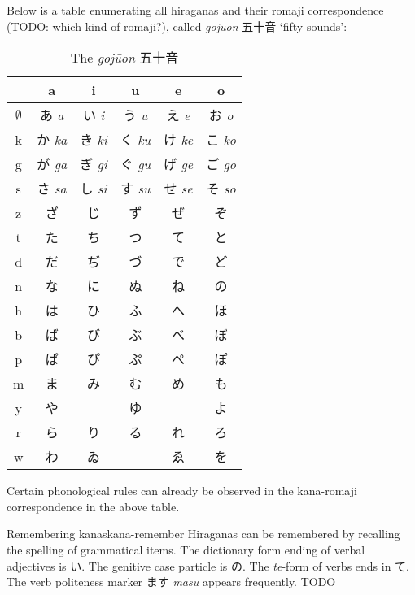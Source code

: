 \documentclass[UTF8, a4paper, oneside, scheme=plain]{ctexrep}
\newcommand{\corpus}[1]{\emph{#1}}
\newcommand{\translate}[1]{`#1'}
\begin{document}
Below is a table enumerating all hiraganas and their romaji correspondence (TODO: which kind of romaji?), 
called \corpus{gojūon} 五十音 \translate{fifty sounds}:
\begin{table}[H]
    \caption{The \corpus{gojūon} 五十音}
    \label{tbl:hiragana-chart}
    \centering
    \begin{tabular}{cccccc}
        \toprule
         & a & i & u & e & o \\ 
        \midrule
        $\emptyset$ & あ \corpus{a} & い \corpus{i} & う \corpus{u} & え \corpus{e} & お \corpus{o} \\ 
        k & か \corpus{ka} & き \corpus{ki} & く \corpus{ku} & け \corpus{ke} & こ \corpus{ko} \\ 
        g & が \corpus{ga} & ぎ \corpus{gi} & ぐ \corpus{gu} & げ \corpus{ge} & ご \corpus{go} \\ 
        s & さ \corpus{sa} & し \corpus{si} & す \corpus{su} & せ \corpus{se} & そ \corpus{so} \\ 
        z & ざ & じ & ず & ぜ & ぞ \\ 
        t & た & ち & つ & て & と \\ 
        d & だ & ぢ & づ & で & ど \\ 
        n & な & に & ぬ & ね & の \\ 
        h & は & ひ & ふ & へ & ほ \\ 
        b & ば & び & ぶ & べ & ぼ \\ 
        p & ぱ & ぴ & ぷ & ぺ & ぽ \\ 
        m & ま & み & む & め & も \\ 
        y & や & ~ & ゆ & ~ & よ \\ 
        r & ら & り & る & れ & ろ \\ 
        w & わ & ゐ & ~ & ゑ & を \\ 
        \bottomrule
    \end{tabular}
\end{table}

Certain phonological rules can already be observed in the kana-romaji correspondence in the above table.

\begin{learnbox}{Remembering kanas}{kana-remember}
    Hiraganas can be remembered by recalling the spelling of grammatical items.
    The dictionary form ending of verbal adjectives is い.
    The genitive case particle is の.
    The \corpus{te}-form of verbs ends in て.
    The verb politeness marker ます \corpus{masu} appears frequently.
    TODO
\end{learnbox}
\end{document}
